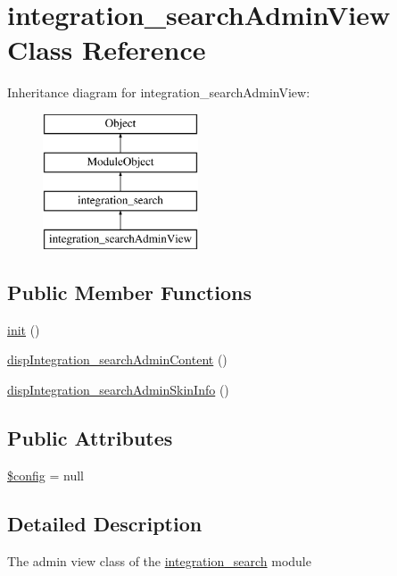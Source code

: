 \hypertarget{classintegration__searchAdminView}{}\section{integration\+\_\+search\+Admin\+View Class Reference}
\label{classintegration__searchAdminView}
Inheritance diagram for integration\+\_\+search\+Admin\+View\+:\begin{figure}[H]
\begin{center}
\leavevmode
\includegraphics[height=4.000000cm]{classintegration__searchAdminView}
\end{center}
\end{figure}
\subsection*{Public Member Functions}
\begin{DoxyCompactItemize}
\item 
\hyperlink{classintegration__searchAdminView_af4c9058a54a1923c25d9c90aeb405887}{init} ()
\item 
\hyperlink{classintegration__searchAdminView_a2ae221c755a586cd2af8d1758edc01c6}{disp\+Integration\+\_\+search\+Admin\+Content} ()
\item 
\hyperlink{classintegration__searchAdminView_a3699d7f7d9f12795783a1cc4d42fcba2}{disp\+Integration\+\_\+search\+Admin\+Skin\+Info} ()
\end{DoxyCompactItemize}
\subsection*{Public Attributes}
\begin{DoxyCompactItemize}
\item 
\hyperlink{classintegration__searchAdminView_ae36349da9a0e5548b5fdc222420a5bc5}{\$config} = null
\end{DoxyCompactItemize}


\subsection{Detailed Description}
The admin view class of the \hyperlink{classintegration__search}{integration\+\_\+search} module

